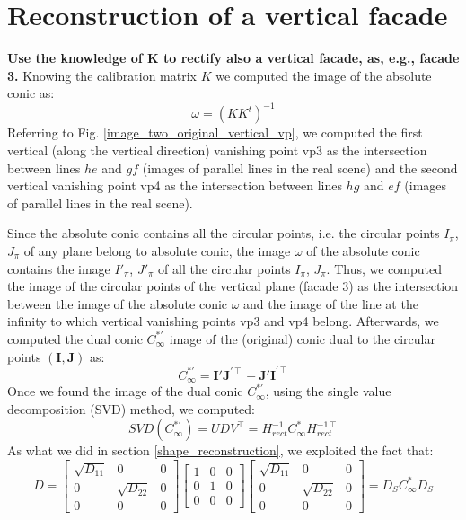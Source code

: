 \documentclass[11pt, oneside]{article}
\begin{document}
\section{Reconstruction of a vertical facade}
\textbf{Use the knowledge of K to rectify also a vertical facade, as, e.g., facade 3.} \hfill \break
Knowing the calibration matrix $K$ we computed the image of the absolute conic as:
$$\omega = (KK^t)^{-1}$$
Referring to Fig. \ref{image_two_original_vertical_vp}, we computed the first vertical (along the vertical direction) vanishing point vp3 as the intersection between lines $he$ and $gf$ (images of parallel lines in the real scene) and the second vertical vanishing point vp4 as the intersection between lines $hg$ and $ef$ (images of parallel lines in the real scene).

Since the absolute conic contains all the circular points, i.e. the circular points $\textit{I}_\pi$, $\textit{J}_\pi$ of any plane belong to absolute conic, the image $\omega$ of the absolute conic contains the image $\textit{I}'_\pi$, $\textit{J}'_\pi$ of all the circular points $\textit{I}_\pi$, $\textit{J}_\pi$. Thus, we computed the image of the circular points of the vertical plane (facade 3) as the intersection between the image of the absolute conic $\omega$ and the image of the line at the infinity to which vertical vanishing points vp3 and vp4 belong. Afterwards, we computed the dual conic $C^{*'}_\infty$ image of the (original) conic dual to the circular points $(\textbf{I},\textbf{J})$ as:
\begin{equation}
	C^{*'}_\infty = \textbf{I}' \textbf{J}^{'\intercal} + \textbf{J}' \textbf{I}^{'\intercal}
\end{equation}
Once we found the image of the dual conic $C^{*'}_\infty$, using the single value decomposition (SVD) method, we computed:
$$SVD(C^{*'}_\infty) = U D V^\intercal = H_{rect}^{-1} C^*_\infty H_{rect}^{-1\intercal}$$
As what we did in section \ref{shape_reconstruction}, we exploited the fact that:
\begin{equation}
	D =
	\begin{bmatrix}
		\sqrt{D_{11}} & 0 & 0 \\ 0 & \sqrt{D_{22}} & 0 \\ 0 & 0 & 0
	\end{bmatrix}
	\begin{bmatrix}
		1 & 0 & 0 \\ 0 & 1 & 0 \\ 0 & 0 & 0
	\end{bmatrix}
	\begin{bmatrix}
		\sqrt{D_{11}} & 0 & 0 \\ 0 & \sqrt{D_{22}} & 0 \\ 0 & 0 & 0
	\end{bmatrix}
	= D_S C^*_\infty D_S
\end{equation}
\end{document}
